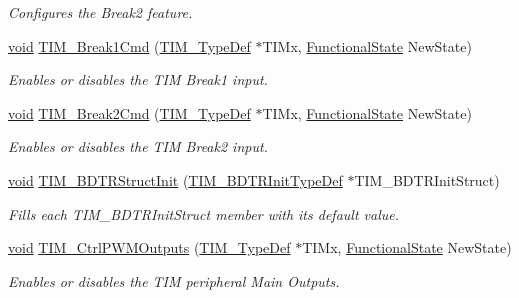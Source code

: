 \begin{DoxyCompactItemize}
\begin{DoxyCompactList}\small\item\em Configures the Break2 feature. \end{DoxyCompactList}\item 
\hyperlink{group___n_a_m_e_ga18028b8badbf1ea7e704ccac3c488e82}{void} \hyperlink{group___t_i_m___group4_ga005d9f7bebe87245c13d3511888399a5}{T\-I\-M\-\_\-\-Break1\-Cmd} (\hyperlink{struct_t_i_m___type_def}{T\-I\-M\-\_\-\-Type\-Def} $\ast$T\-I\-Mx, \hyperlink{group___exported__types_gac9a7e9a35d2513ec15c3b537aaa4fba1}{Functional\-State} New\-State)
\begin{DoxyCompactList}\small\item\em Enables or disables the T\-I\-M Break1 input. \end{DoxyCompactList}\item 
\hyperlink{group___n_a_m_e_ga18028b8badbf1ea7e704ccac3c488e82}{void} \hyperlink{group___t_i_m___group4_ga72aa91ef2780237e940fd4cde232f561}{T\-I\-M\-\_\-\-Break2\-Cmd} (\hyperlink{struct_t_i_m___type_def}{T\-I\-M\-\_\-\-Type\-Def} $\ast$T\-I\-Mx, \hyperlink{group___exported__types_gac9a7e9a35d2513ec15c3b537aaa4fba1}{Functional\-State} New\-State)
\begin{DoxyCompactList}\small\item\em Enables or disables the T\-I\-M Break2 input. \end{DoxyCompactList}\item 
\hyperlink{group___n_a_m_e_ga18028b8badbf1ea7e704ccac3c488e82}{void} \hyperlink{group___t_i_m___group4_gaea0f49938cda8ae0738162194798afc6}{T\-I\-M\-\_\-\-B\-D\-T\-R\-Struct\-Init} (\hyperlink{struct_t_i_m___b_d_t_r_init_type_def}{T\-I\-M\-\_\-\-B\-D\-T\-R\-Init\-Type\-Def} $\ast$T\-I\-M\-\_\-\-B\-D\-T\-R\-Init\-Struct)
\begin{DoxyCompactList}\small\item\em Fills each T\-I\-M\-\_\-\-B\-D\-T\-R\-Init\-Struct member with its default value. \end{DoxyCompactList}\item 
\hyperlink{group___n_a_m_e_ga18028b8badbf1ea7e704ccac3c488e82}{void} \hyperlink{group___t_i_m___group4_ga3e59ebced2ab8e0b817c460f1670e97d}{T\-I\-M\-\_\-\-Ctrl\-P\-W\-M\-Outputs} (\hyperlink{struct_t_i_m___type_def}{T\-I\-M\-\_\-\-Type\-Def} $\ast$T\-I\-Mx, \hyperlink{group___exported__types_gac9a7e9a35d2513ec15c3b537aaa4fba1}{Functional\-State} New\-State)
\begin{DoxyCompactList}\small\item\em Enables or disables the T\-I\-M peripheral Main Outputs. \end{DoxyCompactList}\item 

\end{DoxyCompactItemize}
